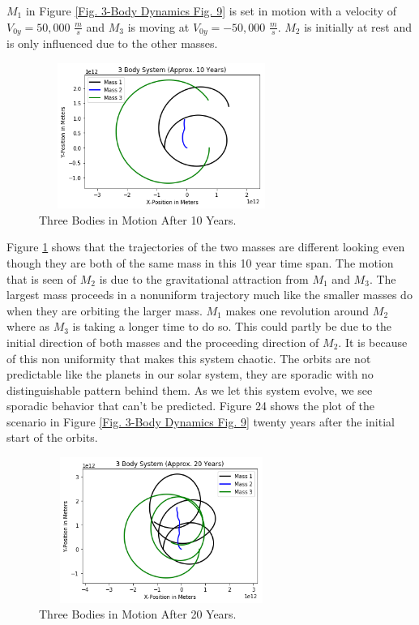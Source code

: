 \documentclass[twocolumn]{article}
\begin{document}
\par \noindent
$M_1$ in Figure \ref{Fig. 3-Body Dynamics Fig. 9} is set in motion with a velocity of $V_{0y}=50,000$ $\frac{m}{s}$ and $M_3$ is moving at $V_{0y}=-50,000$ $\frac{m}{s}$. $M_2$ is initially at rest and is only influenced due to the other masses. 
\begin{figure}[h]
    \centering
    \includegraphics[width=8cm, height=4.75cm]{Figures/3-Body Dynamics (10).png}
    \caption{\small{Three Bodies in Motion After 10 Years.}}
    \label{Fig. 3-Body Dynamics Fig. 10}
\end{figure}
\par \indent
Figure \ref{Fig. 3-Body Dynamics Fig. 10} shows that the trajectories of the two masses are different looking even though they are both of the same mass in this 10 year time span. The motion that is seen of $M_2$ is due to the gravitational attraction from $M_1$ and $M_3$. The largest mass proceeds in a nonuniform trajectory much like the smaller masses do when they are orbiting the larger mass. $M_1$ makes one revolution around $M_2$ where as $M_3$ is taking a longer time to do so. This could partly be due to the initial direction of both masses and the proceeding direction of $M_2$. It is because of this non uniformity that makes this system chaotic. The orbits are not predictable like the planets in our solar system, they are sporadic with no distinguishable pattern behind them. As we let this system evolve, we see sporadic behavior that can't be predicted. Figure 24 shows the plot of the scenario in Figure \ref{Fig. 3-Body Dynamics Fig. 9} twenty years after the initial start of the orbits.
\begin{figure}[h]
    \centering
    \includegraphics[width=8cm, height=4.75cm]{Figures/3-Body Dynamics (11).png}
    \caption{\small{Three Bodies in Motion After 20 Years.}}
    \label{Fig. 3-Body Dynamics Fig. 11}
\end{figure}
\end{document}
